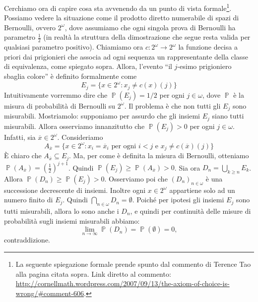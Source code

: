 \documentclass[12pt,a4paper]{report}
\theoremstyle{definition}
\theoremstyle{num.custom-title}
\DeclareMathOperator{\PPP}{\mathbb{P}}
\DeclareMathOperator{\sse}{\subseteq}
\begin{document}
Cerchiamo ora di capire cosa sta avvenendo da un punto di vista formale\footnote{La seguente spiegazione formale prende spunto dal commento di Terence Tao alla pagina citata sopra. Link diretto al commento: \url{http://cornellmath.wordpress.com/2007/09/13/the-axiom-of-choice-is-wrong/\#comment-606}.}. Possiamo vedere la situazione come il prodotto diretto numerabile di spazi di Bernoulli, ovvero $2^\omega$, dove assumiamo che ogni singola prova di Bernoulli ha parametro $\frac{1}{2}$ (in realtà la struttura della dimostrazione che segue resta valida per qualsiasi parametro positivo). Chiamiamo ora $c: 2^\omega \to 2^\omega$ la funzione decisa a priori dai prigionieri che associa ad ogni sequenza un rappresentante della classe di equivalenza, come spiegato sopra. Allora, l'evento ``il $j$-esimo prigioniero sbaglia colore'' è definito formalmente come 
\[
E_j=\{x \in 2^\omega : x_j \neq c(x)(j)\}
\]
Intuitivamente vorremmo dire che $\PPP(E_j)=1/2$ per ogni $j \in \omega$, dove $\PPP$ è la misura di probabilità di Bernoulli su $2^\omega$. Il problema è che non tutti gli $E_j$ sono misurabili. Mostriamolo: supponiamo per assurdo che gli insiemi $E_j$ siano tutti misurabili. Allora osserviamo innanzitutto che $\PPP(E_j)>0$ per ogni $j \in \omega$. Infatti, sia $\overline{x} \in 2^\omega$. Consideriamo 
\[
A_{\overline{x}}=\{x \in 2^\omega : x_i=\overline{x}_i \text{ per ogni $i<j$ e } x_j \neq c(\overline{x})(j)\}
\]
È chiaro che $A_{\overline{x}} \sse E_j$. Ma, per come è definita la misura di Bernoulli, otteniamo $\PPP(A_{\overline{x}})=(\frac{1}{2})^{j+1}$. Quindi $\PPP(E_j) \geq \PPP(A_{\overline{x}})>0$.
Sia ora $D_n=\bigcup_{k \geq n} E_k$. Allora $\PPP(D_n) \geq \PPP(E_j)>0$. Osserviamo poi che $(D_n)_{n \in \omega}$ è una successione decrescente di insiemi. Inoltre ogni $x \in 2^\omega$ appartiene solo ad un numero finito di $E_j$. Quindi $\bigcap_{n \in \omega} D_n = \emptyset$. Poiché per ipotesi gli insiemi $E_j$ sono tutti misurabili, allora lo sono anche i $D_n$, e quindi per continuità delle misure di probabilità sugli insiemi misurabili abbiamo:
\[
\lim_{n \to \infty} \PPP(D_n) = \PPP(\emptyset)=0,
\]
contraddizione.





\cleardoublepage
\end{document}
